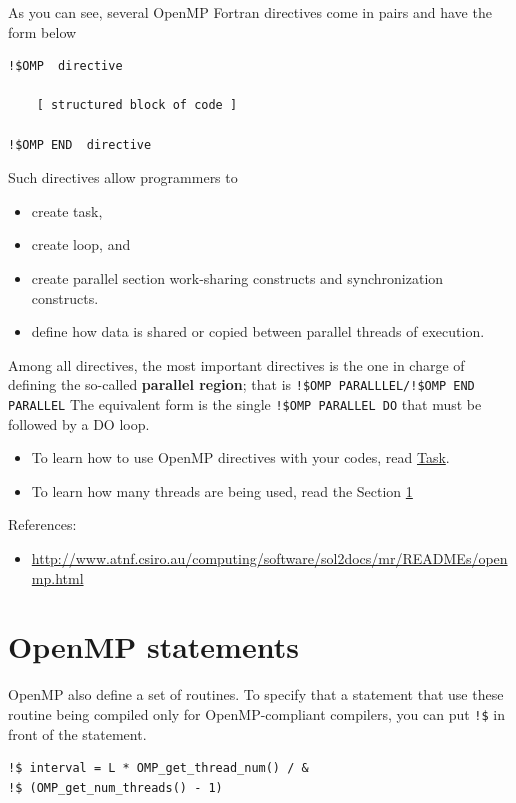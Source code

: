 As you can see, several OpenMP Fortran directives come in pairs and
have the form below
\begin{verbatim}
!$OMP  directive 

    [ structured block of code ]

!$OMP END  directive
\end{verbatim}

Such directives allow programmers to
\begin{itemize}
\item create task,
\item create loop, and 
\item create parallel section work-sharing
constructs and synchronization constructs. 
\item define how data is shared or copied between parallel threads of
  execution.
\end{itemize}

Among all directives, the most important directives is the one in
charge of defining the so-called {\bf parallel region}; that is
\verb.!$OMP PARALLLEL/!$OMP END PARALLEL. The equivalent form is the
single \verb.!$OMP PARALLEL DO. that must be followed by a DO loop.

\begin{itemize}
\item To learn how to use  OpenMP directives with your codes, read
\hyperref[sec:tasks]{Task}. 

\item To learn how many threads are being used, read the Section
\ref{sec:openmp-statements}

\end{itemize}

References:
\begin{itemize}
\item \url{http://www.atnf.csiro.au/computing/software/sol2docs/mr/READMEs/openmp.html}
\end{itemize}

\section{OpenMP statements}
\label{sec:openmp-statements}

OpenMP also define a set of routines. To specify that a statement that
use these routine being compiled only for OpenMP-compliant compilers,
you can put \verb.!$. in front of the statement.
\begin{lstlisting}
!$ interval = L * OMP_get_thread_num() / &
!$ (OMP_get_num_threads() - 1)
\end{lstlisting}

